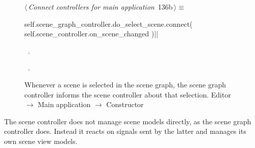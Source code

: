 \documentclass[%
    a4paper,    %
    justified,  %
    nobib,      %
    openany     %
]{tufte-book}
\makeatletter
\renewcommand{\label}[1]{\@tufte@label{##1}}%
\makeatother
\begin{document}
\begin{figure}[!htbp]
\begin{flushleft} \small
\begin{minipage}{\linewidth}\label{scrap84}\raggedright\small
{} $\langle\,${\itshape Connect controllers for main application}\nobreak\ {\footnotesize {136b}}$\,\rangle\equiv$
\vspace{-1ex}
\begin{pythoncode}
self.scene_graph_controller.do_select_scene.connect(
    self.scene_controller.on_scene_changed
)|\NWsep|
\end{pythoncode}
\vspace{1.5ex}
\footnotesize
\begin{list}{}{\setlength{\itemsep}{-\parsep}\setlength{\itemindent}{-\leftmargin}}
\item \NWtxtMacroDefBy\ .
\item \NWtxtMacroRefIn\ .

\item{}
\end{list}
\end{minipage}\vspace{4ex}
\end{flushleft}
\caption{Whenever a scene is selected in the scene graph, the scene graph
  controller informs the scene controller about that selection.
  \newline{}\newline{}Editor $\rightarrow$ Main application $\rightarrow$
  Constructor}
\end{figure}

The scene controller does not manage scene models directly, as the scene graph
controller does. Instead it reacts on signals sent by the latter and manages
its own scene view models.
\end{document}
